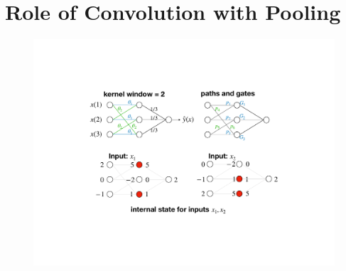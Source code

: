 \section{Role of Convolution with Pooling}
\FloatBarrier
\begin{figure}[H]
\centering
\includegraphics[scale=0.4]{figs/conv.pdf}
\end{figure}